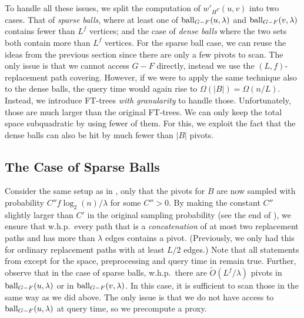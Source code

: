 \documentclass{article}\usepackage[a4paper,margin=20mm]{geometry}
\newcommand*{\Otilde}{\widetilde{O}}
\newcommand*{\ball}{\mbox{\rm ball}}
\begin{document}
To handle all these issues, we split the computation of $w'_{H^F}(u,v)$ into two cases. 
That of \emph{sparse balls}, where at least one of $\ball_{G-F}(u,\lambda)$ and $\ball_{G-F}(v,\lambda)$ contains fewer than $L^f$ vertices;
and the case of \emph{dense balls} where the two sets both contain more than $L^f$ vertices.
For the sparse ball case, we can reuse the ideas from the previous section
since there are only a few pivots to scan.
The only issue is that we cannot access $G-F$ directly,
instead we use the $(L,f)$-replacement path covering.
However, if we were to apply the same technique also to the dense balls,
the query time would again rise to $\Omega(|B|) = \Omega(n/L)$.
Instead, we introduce FT-trees \emph{with granularity} to handle those.
Unfortunately, those are much larger than the original FT-trees.
We can only keep the total space subquadratic by using fewer of them.
For this, we exploit the fact that the dense balls can also be hit by much fewer than $|B|$ pivots.


\subsection{The Case of Sparse Balls}
\label{subsec:improved_query_sparse}

Consider the same setup as in ,
only that the pivots for $B$ are now sampled with probability $C'' f \log_2(n)/\lambda$
for some $C'' > 0$.
By making the constant $C''$ slightly larger than $C'$ in the original sampling probability
(see the end of ),
we ensure that w.h.p.\ every path that is a \emph{concatenation} of at most two
replacement paths and has more than $\lambda$ edges contains a pivot.
(Previously, we only had this for ordinary replacement paths with at least $L/2$ edges.)
Note that all statements from 
except for the space, preprocessing and query time in  remain true.
Further, observe that in the case of sparse balls, w.h.p.\ there are $\Otilde(L^{f}/\lambda)$ pivots in 
$\ball_{G-F}(u,\lambda)$ or in $\ball_{G-F}(v,\lambda)$.
In this case, it is sufficient to scan those in the same way as we did above.
The only issue is that we do not have access to $\ball_{G-F}(u,\lambda)$ at query time,
so we precompute a proxy.
\end{document}
